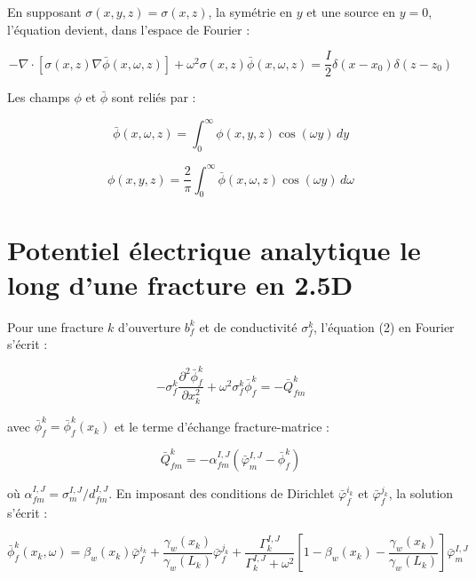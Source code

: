 En supposant $\sigma(x,y,z)=\sigma(x,z)$, la symétrie en $y$ et une source en $y=0$, l'équation devient, dans l'espace de Fourier :

\begin{equation}
-\nabla \cdot [\sigma(x,z) \nabla \bar{\phi}(x,\omega,z)] + \omega^2 \sigma(x,z) \bar{\phi}(x,\omega,z)
= \frac{I}{2} \delta(x-x_0)\delta(z-z_0)
\end{equation}

Les champs $\phi$ et $\bar{\phi}$ sont reliés par :

\begin{equation}
\bar{\phi}(x,\omega,z)=\int_0^{\infty} \phi(x,y,z)\cos(\omega y)\,dy
\end{equation}

\begin{equation}
\phi(x,y,z)=\frac{2}{\pi}\int_0^{\infty} \bar{\phi}(x,\omega,z)\cos(\omega y)\,d\omega
\end{equation}

\section{Potentiel électrique analytique le long d'une fracture en 2.5D}

Pour une fracture $k$ d'ouverture $b_f^k$ et de conductivité $\sigma_f^k$, l'équation (2) en Fourier s'écrit :

\begin{equation}
-\sigma_f^k \frac{\partial^2 \bar{\phi}_f^k}{\partial x_k^2} + \omega^2 \sigma_f^k \bar{\phi}_f^k = -\bar{Q}_{fm}^k
\end{equation}

avec $\bar{\phi}_f^k=\bar{\phi}_f^k(x_k)$ et le terme d'échange fracture-matrice :

\begin{equation}
\bar{Q}_{fm}^k = -\alpha_{fm}^{I,J}\left(\bar{\varphi}_m^{I,J}-\bar{\phi}_f^k\right)
\end{equation}

où $\alpha_{fm}^{I,J}=\sigma_m^{I,J}/d_{fm}^{I,J}$. En imposant des conditions de Dirichlet $\bar{\varphi}_f^{i_k}$ et $\bar{\varphi}_f^{j_k}$, la solution s'écrit :

\begin{equation}
\bar{\phi}_f^k(x_k,\omega)=\beta_w(x_k)\bar{\varphi}_f^{i_k}+\frac{\gamma_w(x_k)}{\gamma_w(L_k)}\bar{\varphi}_f^{j_k}
+\frac{\Gamma_k^{I,J}}{\Gamma_k^{I,J}+\omega^2}\left[1-\beta_w(x_k)-\frac{\gamma_w(x_k)}{\gamma_w(L_k)}\right]\bar{\varphi}_m^{I,J}
\end{equation}

